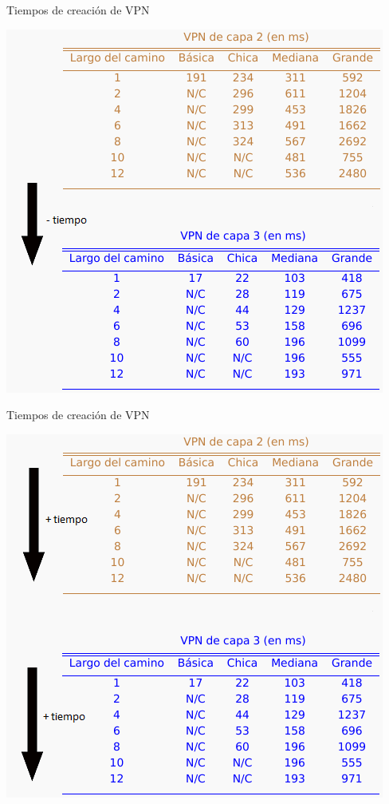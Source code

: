 \documentclass[xcolor=svgnames]{beamer}
\begin{document}
\begin{frame}{Tiempos de creación de VPN}
	\begin{center}
		\includegraphics[height=0.9\textheight]{tiempos_vpn_tipo}
	\end{center}
\end{frame}

\begin{frame}{Tiempos de creación de VPN}
	\begin{center}
		\includegraphics[height=0.9\textheight]{tiempos_vpn_camino}
	\end{center}
\end{frame}
\end{document}
